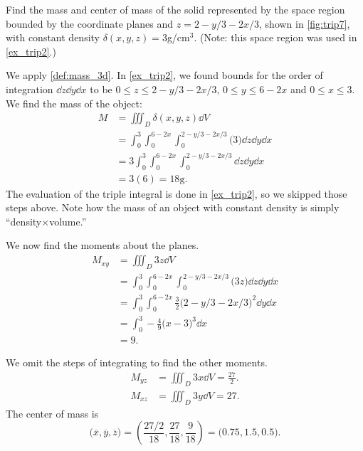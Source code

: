 \begin{example}\label{ex_trip7}
Find the mass and center of mass of the solid represented by the space region bounded by the coordinate planes and $z=2-y/3-2x/3$, shown in \autoref{fig:trip7}, with constant density $\delta(x,y,z)=3$g/cm$^3$. (Note: this space region was used in \autoref{ex_trip2}.)

\solution
We apply \autoref{def:mass_3d}. In \autoref{ex_trip2}, we found bounds for the order of integration $\dd z\dd y\dd x$ to be $0\leq z\leq 2-y/3-2x/3$, $0\leq y\leq 6-2x$ and $0\leq x\leq 3$. We find the mass of the object: 
\begin{align*}
M &= \iiint_D \delta(x,y,z)\dd V \\
  &= \int_0^3\int_0^{6-2x}\int_0^{2-y/3-2x/3} \bigl(3\bigr)\dd z\dd y\dd x\\
	&= 3\int_0^3\int_0^{6-2x}\int_0^{2-y/3-2x/3} \dd z\dd y\dd x\\
	&= 3(6) = 18\text{g}.
\end{align*}
The evaluation of the triple integral is done in \autoref{ex_trip2}, so we skipped those steps above. Note how the mass of an object with constant density is simply ``density$\times$volume.''

We now find the moments about the planes.
\begin{align*}
M_{xy} &= \iiint_D 3z\dd V \\
			&= \int_0^3\int_0^{6-2x}\int_0^{2-y/3-2x/3} \bigl(3z\bigr)\dd z\dd y\dd x\\
			&= \int_0^3\int_0^{6-2x} \frac32\bigl(2-y/3-2x/3\bigr)^2\dd y\dd x \\
			&= \int_0^3 -\frac49\bigl(x-3\bigr)^3\dd x\\
			&= 9.
\end{align*}

We omit the steps of integrating to find the other moments.
\begin{align*}
M_{yz} &= \iiint_D 3x\dd V = \frac{27}2.\\
M_{xz} &= \iiint_D 3y\dd V = 27.
\end{align*}
The center of mass is
\[\bigl(\overline{x},\overline{y},\overline{z}\bigr) = \left(\frac{27/2}{18},\frac{27}{18},\frac{9}{18}\right) = \bigl(0.75,1.5,0.5\bigr).\]
\end{example}


